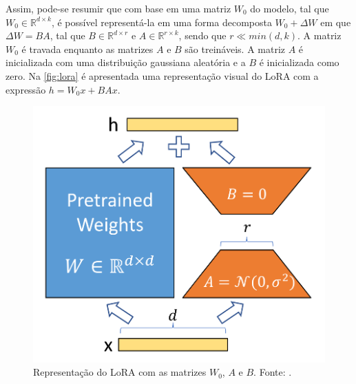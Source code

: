 Assim, pode-se resumir que com base em uma matriz \begin{math}W_0\end{math} do modelo, tal que \begin{math}W_0 \in \mathbb{R}^{d \times k}\end{math}, é possível
representá-la em uma forma decomposta \begin{math}W_0 + \Delta W\end{math} em que \begin{math}\Delta W = BA\end{math}, tal que
\begin{math}B \in \mathbb{R}^{d \times r}\end{math} e \begin{math}A \in \mathbb{R}^{r \times k}\end{math}, sendo que \begin{math}r \ll min(d, k)\end{math}. A matriz
\begin{math}W_0\end{math} é travada enquanto as matrizes \begin{math}A\end{math} e \begin{math}B\end{math} são treináveis. A matriz \begin{math}A\end{math} é
inicializada com uma distribuição gaussiana aleatória e a \begin{math}B\end{math} é inicializada como zero. Na \autoref{fig:lora} é apresentada uma representação visual
do \ac{LoRA} com a expressão \begin{math}h = W_0x + BAx\end{math}.

\begin{figure}[ht]
      \centering
      \includegraphics[width=0.35\columnwidth,keepaspectratio]{images/lora.png}
      \caption{\small Representação do \ac{LoRA} com as matrizes \begin{math}W_0\end{math}, \begin{math}A\end{math} e \begin{math}B\end{math}. Fonte:
            \textcite{hu2021lora}.}
      \label{fig:lora}
\end{figure}

